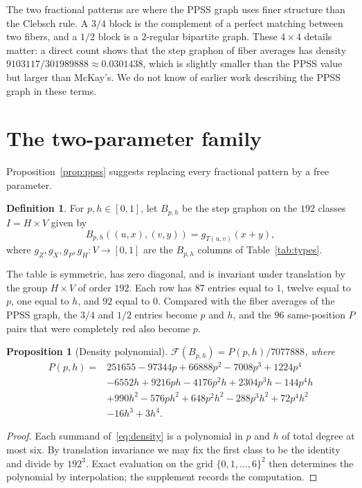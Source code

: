 \documentclass[11pt]{article}
\newtheorem{proposition}[theorem]{Proposition}
\theoremstyle{definition}
\newtheorem{definition}[theorem]{Definition}
\theoremstyle{remark}
\newcommand{\F}{\mathcal F}
\begin{document}
The two fractional patterns are where the PPSS graph uses finer structure than the Clebsch rule.
A $3/4$ block is the complement of a perfect matching between two fibers, and a $1/2$ block is a $2$-regular bipartite graph.
These $4\times4$ details matter: a direct count shows that the step graphon of fiber averages has density $9103117/301989888\approx0.0301438$, which is slightly smaller than the PPSS value but larger than McKay's.
We do not know of earlier work describing the PPSS graph in these terms.

\section{The two-parameter family}
\label{sec:base}

Proposition~\ref{prop:ppss} suggests replacing every fractional pattern by a free parameter.

\begin{definition}
For $p,h\in[0,1]$, let $B_{p,h}$ be the step graphon on the $192$ classes $I=H\times V$ given by
\begin{equation}
\label{eq:base}
 B_{p,h}((u,x),(v,y))=g_{T(u,v)}(x+y),
\end{equation}
where $g_Z,g_X,g_P,g_H\colon V\to[0,1]$ are the $B_{p,h}$ columns of Table~\ref{tab:types}.
\end{definition}

The table is symmetric, has zero diagonal, and is invariant under translation by the group $H\times V$ of order $192$.
Each row has $87$ entries equal to $1$, twelve equal to $p$, one equal to $h$, and $92$ equal to $0$.
Compared with the fiber averages of the PPSS graph, the $3/4$ and $1/2$ entries become $p$ and $h$, and the $96$ same-position $P$ pairs that were completely red also become $p$.

\begin{proposition}[Density polynomial]
\label{prop:poly}
$\F(B_{p,h})=P(p,h)/7077888$, where
\begin{equation}
\label{eq:poly}
\begin{aligned}
P(p,h)={}&251655-97344p+66888p^2-7008p^3+1224p^4\\
 &-6552h+9216ph-4176p^2h+2304p^3h-144p^4h\\
 &+990h^2-576ph^2+648p^2h^2-288p^3h^2+72p^4h^2\\
 &-16h^3+3h^4.
\end{aligned}
\end{equation}
\end{proposition}
\begin{proof}
Each summand of~\eqref{eq:density} is a polynomial in $p$ and $h$ of total degree at most six.
By translation invariance we may fix the first class to be the identity and divide by $192^3$.
Exact evaluation on the grid $\{0,1,\dots,6\}^2$ then determines the polynomial by interpolation; the supplement records the computation.
\end{proof}
\end{document}
